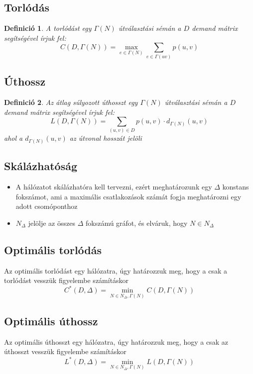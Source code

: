 \documentclass[12pt]{report}
\newtheorem{mydef}{Definició}
\begin{document}
\subsection{Torlódás}

\begin{mydef}
	A torlódást egy \(\Gamma(N)\) útválasztási sémán a \(D\) demand mátrix segítségével írjuk fel: \[C(D, \Gamma(N)) = \max_{e \in \Gamma(N)}  \sum_{e \in \Gamma(uv)} p(u,v) \]
\end{mydef}

\subsection{Úthossz}

\begin{mydef}
	Az átlag súlyozott úthosszt egy \(\Gamma(N)\) útválasztási sémán a \(D\) demand mátrix segítségével írjuk fel: \[L(D, \Gamma(N)) = \sum_{(u,v) \in D}  p(u,v)  \cdot d_{\Gamma(N)}(u, v) \] ahol a \(d_{\Gamma(N)}(u, v)\) az útvonal hosszát jelöli
\end{mydef}

\subsection{Skálázhatóság}

\begin{itemize}
	\item A hálózatot skálázhatóra kell tervezni, ezért meghatározunk egy \(\Delta\) konstans fokszámot, ami a maximális csatlakozások számát fogja meghatározni egy adott csomóponthoz
	\item \(N_\Delta\) jelölje az összes \(\Delta\) fokszámú gráfot, és elváruk, hogy \(N \in N_\Delta\)
\end{itemize}

\subsection{Optimális torlódás}

Az optimális torlódást egy  hálózatra, úgy határozzuk meg, hogy a csak a torlódást vesszük figyelembe számításkor \[C^*(D, \Delta) = \min_{N \in N_\Delta, \Gamma(N)} C(D, \Gamma(N))\]

\subsection{Optimális úthossz}

Az optimális úthosszt egy  hálózatra, úgy határozzuk meg, hogy a csak az úthosszt vesszük figyelembe számításkor \[L^*(D, \Delta) = \min_{N \in N_\Delta, \Gamma(N)} L(D, \Gamma(N))\]
\end{document}
